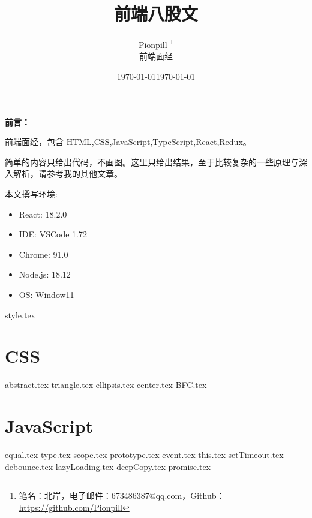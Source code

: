 \documentclass{PionpillNote-book}
\title{前端八股文}
\author{
    Pionpill \footnote{笔名：北岸，电子邮件：673486387@qq.com，Github：\url{https://github.com/Pionpill}} \\
    前端面经\\
}
\date{\today}
\begin{document}
\pagestyle{plain}
\maketitle

\noindent\textbf{前言：}

前端面经，包含 HTML,CSS,JavaScript,TypeScript,React,Redux。

简单的内容只给出代码，不画图。这里只给出结果，至于比较复杂的一些原理与深入解析，请参考我的其他文章。

本文撰写环境:

\begin{itemize}
    \item React: 18.2.0
    \item IDE: VSCode 1.72 
    \item Chrome: 91.0
    \item Node.js: 18.12
    \item OS: Window11
\end{itemize}

\date{\today}
\newpage

\tableofcontents

\newpage

\setcounter{page}{1} 
\pagestyle{fancy}

{style.tex}
\chapter{CSS}
{abstract.tex}
{triangle.tex}
{ellipsis.tex}
{center.tex}
{BFC.tex}
\newpage
\chapter{JavaScript}
{equal.tex}
{type.tex}
{scope.tex}
{prototype.tex}
{event.tex}
{this.tex}
{setTimeout.tex}
{debounce.tex}
{lazyLoading.tex}
{deepCopy.tex}
{promise.tex}
\end{document}
